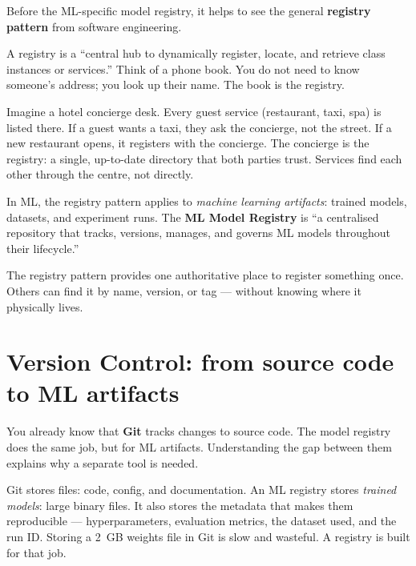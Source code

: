 \documentclass[a4paper,11pt]{article}
\newcommand{\vocab}[1]{\textbf{\color{navy}#1}}
\begin{document}
Before the ML-specific model registry, it helps to see the general
\vocab{registry pattern} from software engineering.

A registry is a ``central hub to dynamically register, locate, and retrieve
class instances or services.'' Think of a phone book. You do not need to know
someone's address; you look up their name. The book is the registry.

\begin{everyday}
Imagine a hotel concierge desk. Every guest service (restaurant, taxi, spa)
is listed there. If a guest wants a taxi, they ask the concierge, not the
street. If a new restaurant opens, it registers with the concierge.
The concierge is the registry: a single, up-to-date directory that both
parties trust. Services find each other through the centre, not directly.
\end{everyday}

In ML, the registry pattern applies to \emph{machine learning artifacts}:
trained models, datasets, and experiment runs. The \vocab{ML Model Registry}
is ``a centralised repository that tracks, versions, manages, and governs ML
models throughout their lifecycle.''

\begin{keytake}
The registry pattern provides one authoritative place to register something
once. Others can find it by name, version, or tag --- without knowing where
it physically lives.
\end{keytake}

\section{Version Control: from source code to ML artifacts}

You already know that \vocab{Git} tracks changes to source code.
The model registry does the same job, but for ML artifacts.
Understanding the gap between them explains why a separate tool is needed.

\begin{intuition}
Git stores files: code, config, and documentation.
An ML registry stores \emph{trained models}: large binary files.
It also stores the metadata that makes them reproducible ---
hyperparameters, evaluation metrics, the dataset used, and the run ID.
Storing a 2~GB weights file in Git is slow and wasteful.
A registry is built for that job.
\end{intuition}
\end{document}
